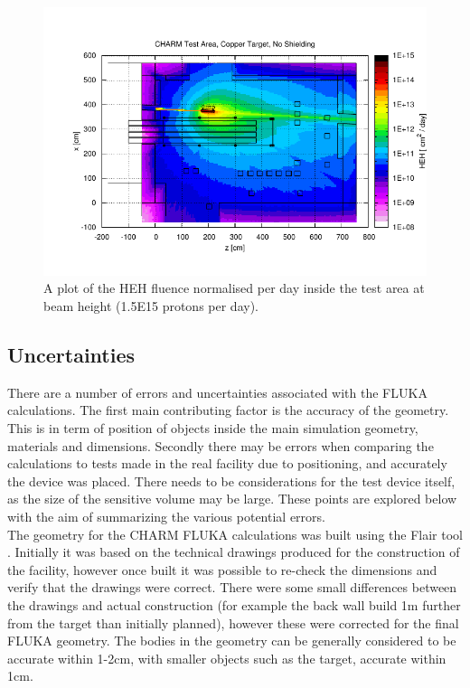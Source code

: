 \begin{figure}[!ht]
	\centering
	\includegraphics[width=\textwidth]{./images/heh_test_area_cpOOOO}
	\caption{A plot of the HEH fluence normalised per day inside the test area at beam height (1.5E15 protons per day).}
	\label{fig:cpOOOO_HEHmap}
\end{figure}

\clearpage
\subsection{Uncertainties}

There are a number of errors and uncertainties associated with the FLUKA calculations. The first main contributing factor is the accuracy of the geometry. This is in term of position of objects inside the main simulation geometry, materials and dimensions. Secondly there may be errors when comparing the calculations to tests made in the real facility due to positioning, and accurately the device was placed. There needs to be considerations for the test device itself, as the size of the sensitive volume may be large. These points are explored below with the aim of summarizing the various potential errors. \\

The geometry for the CHARM FLUKA calculations was built using the Flair tool \cite{FLAIR1}. Initially it was based on the technical drawings produced for the construction of the facility, however once built it was possible to re-check the dimensions and verify that the drawings were correct. There were some small differences between the drawings and actual construction (for example the back wall build 1m further from the target than initially planned), however these were corrected for the final FLUKA geometry. The bodies in the geometry can be generally considered to be accurate within 1-2cm, with smaller objects such as the target, accurate within 1cm. \\

